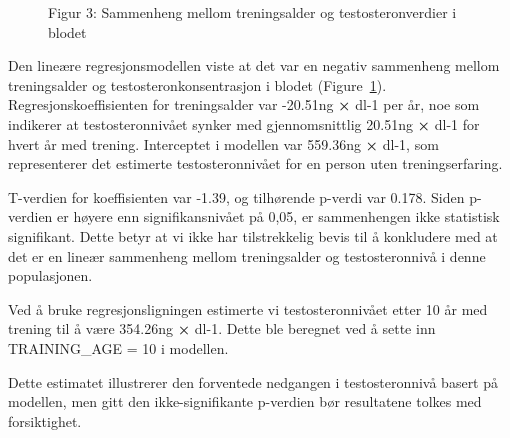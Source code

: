 \documentclass[
  letterpaper,
  DIV=11,
  numbers=noendperiod]{scrreprt}
\begin{document}
\begin{figure}


\caption{\label{fig-fig3}Figur 3: Sammenheng mellom treningsalder og
testosteronverdier i blodet}

\end{figure}%

Den lineære regresjonsmodellen viste at det var en negativ sammenheng
mellom treningsalder og testosteronkonsentrasjon i blodet
(Figure~\ref{fig-fig3}). Regresjonskoeffisienten for treningsalder var
-20.51ng \textbf{×} dl-1 per år, noe som indikerer at testosteronnivået
synker med gjennomsnittlig 20.51ng \textbf{×} dl-1 for hvert år med
trening. Interceptet i modellen var 559.36ng \textbf{×} dl-1, som
representerer det estimerte testosteronnivået for en person uten
treningserfaring.

T-verdien for koeffisienten var -1.39, og tilhørende p-verdi var 0.178.
Siden p-verdien er høyere enn signifikansnivået på 0,05, er sammenhengen
ikke statistisk signifikant. Dette betyr at vi ikke har tilstrekkelig
bevis til å konkludere med at det er en lineær sammenheng mellom
treningsalder og testosteronnivå i denne populasjonen.

Ved å bruke regresjonsligningen estimerte vi testosteronnivået etter 10
år med trening til å være 354.26ng \textbf{×} dl-1. Dette ble beregnet
ved å sette inn TRAINING\_AGE = 10 i modellen.

Dette estimatet illustrerer den forventede nedgangen i testosteronnivå
basert på modellen, men gitt den ikke-signifikante p-verdien bør
resultatene tolkes med forsiktighet.
\end{document}
